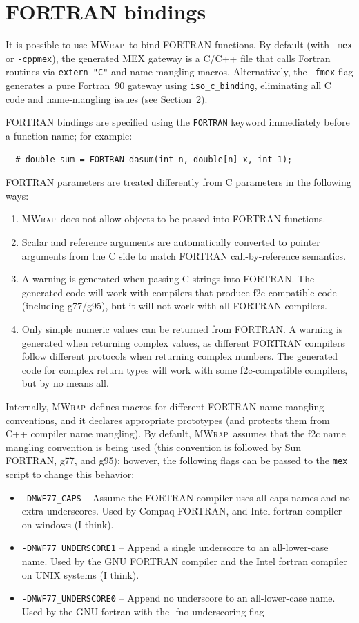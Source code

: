 \documentclass[12pt]{article}
\newcommand{\mwrap}{\textsc{MWrap}}
\begin{document}
\section{FORTRAN bindings}

It is possible to use \mwrap\ to bind FORTRAN functions.  By default
(with {\tt -mex} or {\tt -cppmex}), the generated MEX gateway is a
C/C++ file that calls Fortran routines via {\tt extern "C"} and
name-mangling macros.  Alternatively, the {\tt -fmex} flag generates
a pure Fortran~90 gateway using {\tt iso\_c\_binding}, eliminating all
C code and name-mangling issues (see Section~2).

FORTRAN bindings are specified using the {\tt FORTRAN} keyword
immediately before a function name; for example:
\begin{verbatim}
  # double sum = FORTRAN dasum(int n, double[n] x, int 1);
\end{verbatim}

FORTRAN parameters are treated differently from C parameters in the
following ways:
\begin{enumerate}
\item
  \mwrap\ does not allow objects to be passed into FORTRAN functions.
\item
  Scalar and reference arguments are automatically converted to pointer
  arguments from the C side to match FORTRAN call-by-reference semantics.
\item
  A warning is generated when passing C strings into FORTRAN.  The generated
  code will work with compilers that produce f2c-compatible code (including
  g77/g95), but it will not work with all FORTRAN compilers.
\item
  Only simple numeric values can be returned from FORTRAN.  A warning is
  generated when returning complex values, as different FORTRAN compilers
  follow different protocols when returning complex numbers.  The generated
  code for complex return types will work with some f2c-compatible compilers, 
  but by no means all.
\end{enumerate}

Internally, \mwrap\ defines macros for different FORTRAN name-mangling
conventions, and it declares appropriate prototypes (and protects them
from C++ compiler name mangling).  By default, \mwrap\ assumes that
the f2c name mangling convention is being used (this convention is
followed by Sun FORTRAN, g77, and g95); however, the following flags
can be passed to the {\tt mex} script to change this behavior:
\begin{itemize}
\item
  {\tt -DMWF77\_CAPS} -- Assume the FORTRAN compiler uses all-caps
  names and no extra underscores.  Used by Compaq FORTRAN, and Intel fortran compiler on windows (I think).
\item
  {\tt -DMWF77\_UNDERSCORE1} -- Append a single underscore to an
  all-lower-case name.  Used by the GNU FORTRAN compiler and the Intel fortran compiler on UNIX systems (I think).
\item
  {\tt -DMWF77\_UNDERSCORE0} -- Append no underscore to an
  all-lower-case name.  Used by the GNU fortran with the -fno-underscoring flag
\end{itemize}
\end{document}
